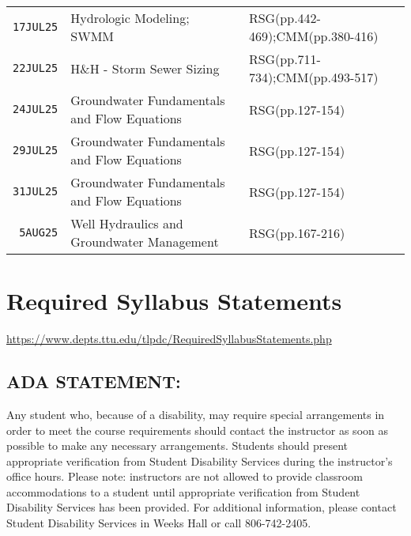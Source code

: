 \documentclass[12pt]{article}
\begin{document}
\begin{table}[ht!]
\begin{tabular}{p{0.5in}p{3.0in}p{3.0in}}
\texttt{17JUL25} & Hydrologic Modeling; SWMM & RSG(pp.442-469);CMM(pp.380-416) \\ %
\texttt{22JUL25} & H\&H - Storm Sewer Sizing &RSG(pp.711-734);CMM(pp.493-517)  \\ %
\texttt{24JUL25} & Groundwater Fundamentals and Flow Equations & RSG(pp.127-154)\\ %
\texttt{29JUL25} & Groundwater Fundamentals and Flow Equations & RSG(pp.127-154)\\ %
\texttt{31JUL25} & Groundwater Fundamentals and Flow Equations & RSG(pp.127-154)  \\ %
\texttt{~5AUG25} & Well Hydraulics and Groundwater Management &  RSG(pp.167-216) \\  %
\hline
   \end{tabular}
   \label{tab:schedule}
\end{table}


\clearpage
\clearpage
%

\section*{Required Syllabus Statements}
\url{https://www.depts.ttu.edu/tlpdc/RequiredSyllabusStatements.php}
\subsection*{ADA STATEMENT:}
Any student who, because of a disability, may require special arrangements in order to meet the course requirements should contact the instructor as soon as possible to make any necessary arrangements. Students should present appropriate verification from Student Disability Services during the instructor's office hours. Please note: instructors are not allowed to provide classroom accommodations to a student until appropriate verification from Student Disability Services has been provided. For additional information, please contact Student Disability Services in Weeks Hall or call 806-742-2405.
\end{document}
